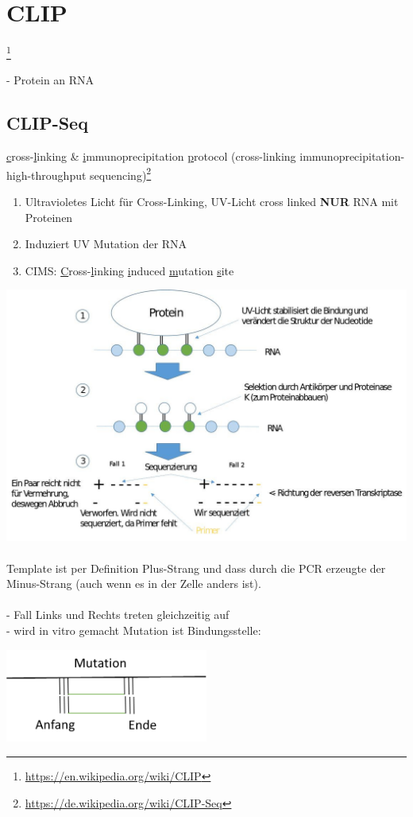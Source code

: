 \section{CLIP}\footnote{\url{https://en.wikipedia.org/wiki/CLIP}}

 - Protein an RNA

\subsection{CLIP-Seq}
\underline{c}ross-\underline{l}inking \& \underline{i}mmunoprecipitation \underline{p}rotocol (cross-linking immunoprecipitation-high-throughput sequencing)\footnote{\url{https://de.wikipedia.org/wiki/CLIP-Seq}}
\begin{enumerate}
	\item Ultravioletes Licht für Cross-Linking, UV-Licht cross linked \textbf{NUR} RNA mit Proteinen
	\item Induziert UV Mutation der RNA
	\item CIMS: \underline{C}ross-\underline{l}inking \underline{i}nduced \underline{m}utation \underline{s}ite
\end{enumerate}

\includegraphics[width=1\textwidth]{lectures/160429/pix/clip_seq.jpg}
\\\\
Template ist per Definition Plus-Strang und dass durch die PCR erzeugte der Minus-Strang (auch wenn es in der Zelle anders ist).
\\\\
 - Fall Links und Rechts treten gleichzeitig auf\\
 - wird in vitro gemacht
\newpage
Mutation ist Bindungsstelle:
\begin{center}
\includegraphics[width=0.5\textwidth]{lectures/160429/pix/mutation.png}
\end{center}

